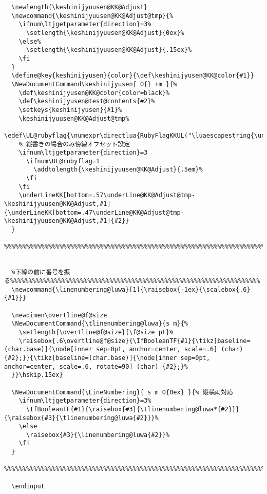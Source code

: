 \documentclass[luatex,fontsize=8pt,paper=b5,twoside]{jlreq}%
\begin{document}
\begin{lstlisting}
  \newlength{\keshinijyuusen@KK@Adjust}
  \newcommand{\keshinijyuusen@KK@Adjust@tmp}{%
    \ifnum\ltjgetparameter{direction}=3%
      \setlength{\keshinijyuusen@KK@Adjust}{0ex}%
    \else%
      \setlength{\keshinijyuusen@KK@Adjust}{.15ex}%
    \fi
  }
  \define@key{keshinijyusen}{color}{\def\keshinijyusen@KK@color{#1}}
  \NewDocumentCommand\keshinijyusen{ O{} +m }{%
    \def\keshinijyusen@KK@color{color=black}%
    \def\keshinijyusen@test@contents{#2}%
    \setkeys{keshinijyusen}{#1}%
    \keshinijyuusen@KK@Adjust@tmp%
    \edef\UL@rubyflag{\numexpr\directlua{RubyFlagKKUL("\luaescapestring{\unexpanded\expandafter{\keshinijyusen@test@contents}}")}\relax}%
    % 縦書きの場合のみ傍線オフセット設定
    \ifnum\ltjgetparameter{direction}=3
      \ifnum\UL@rubyflag=1
        \addtolength{\keshinijyuusen@KK@Adjust}{.5em}%
      \fi
    \fi
    \underLineKK[bottom=.57\underLine@KK@Adjust@tmp-\keshinijyuusen@KK@Adjust,#1]{\underLineKK[bottom=.47\underLine@KK@Adjust@tmp-\keshinijyuusen@KK@Adjust,#1]{#2}}
  }
  %%%%%%%%%%%%%%%%%%%%%%%%%%%%%%%%%%%%%%%%%%%%%%%%%%%%%%%%%%%%%%%%%%%%%%%%%%%%%%%%%%%%%%%%%


  %下線の前に番号を振る%%%%%%%%%%%%%%%%%%%%%%%%%%%%%%%%%%%%%%%%%%%%%%%%%%%%%%%%%%%%%%%%%%%%
  \newcommand{\linenumbering@luwa}[1]{\raisebox{-1ex}{\scalebox{.6}{#1}}}

  \newdimen\overtline@f@size
  \NewDocumentCommand{\tlinenumbering@luwa}{s m}{%
    \setlength{\overtline@f@size}{\f@size pt}%
    \raisebox{.6\overtline@f@size}{\IfBooleanTF{#1}{\tikz[baseline=(char.base)]{\node[inner sep=0pt, anchor=center, scale=.6] (char) {#2};}}{\tikz[baseline=(char.base)]{\node[inner sep=0pt, anchor=center, scale=.6, rotate=90] (char) {#2};}%
  }}\hskip.15ex}

  \NewDocumentCommand{\LineNumbering}{ s m O{0ex} }{% 縦横両対応
    \ifnum\ltjgetparameter{direction}=3%
      \IfBooleanTF{#1}{\raisebox{#3}{\tlinenumbering@luwa*{#2}}}{\raisebox{#3}{\tlinenumbering@luwa{#2}}}%
    \else
      \raisebox{#3}{\linenumbering@luwa{#2}}%
    \fi
  }
  %%%%%%%%%%%%%%%%%%%%%%%%%%%%%%%%%%%%%%%%%%%%%%%%%%%%%%%%%%%%%%%%%%%%%%%%%%%%%%%%%%%%%%%%%

  \endinput
\end{lstlisting}
\end{document}
